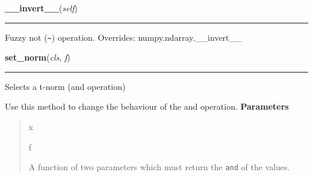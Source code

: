     \vspace{0.5ex}

\hspace{.8\funcindent}\begin{boxedminipage}{\funcwidth}

    \raggedright \textbf{\_\_invert\_\_}(\textit{self})

    \vspace{-1.5ex}

    \rule{\textwidth}{0.5\fboxrule}
\setlength{\parskip}{2ex}

Fuzzy not (\texttt{\textasciitilde{}}) operation.
\setlength{\parskip}{1ex}
      Overrides: numpy.ndarray.\_\_invert\_\_

    \end{boxedminipage}

    \label{peach:fuzzy:base:FuzzySet:set_norm}

    \vspace{0.5ex}

\hspace{.8\funcindent}\begin{boxedminipage}{\funcwidth}

    \raggedright \textbf{set\_norm}(\textit{cls}, \textit{f})

    \vspace{-1.5ex}

    \rule{\textwidth}{0.5\fboxrule}
\setlength{\parskip}{2ex}

Selects a t-norm (and operation)

Use this method to change the behaviour of the and operation.
\setlength{\parskip}{1ex}
      \textbf{Parameters}
      \vspace{-1ex}

      \begin{quote}
        \begin{Ventry}{x}

          \item[f]


A function of two parameters which must return the \texttt{and} of the
values.
        \end{Ventry}

      \end{quote}

    \end{boxedminipage}

